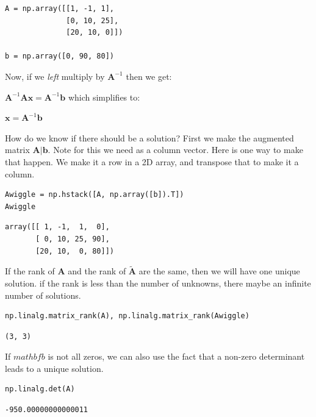 \documentclass[11pt]{article}
\begin{document}
\begin{verbatim}
A = np.array([[1, -1, 1],
              [0, 10, 25],
              [20, 10, 0]])

b = np.array([0, 90, 80])
\end{verbatim}

Now, if we \emph{left} multiply by \(\mathbf{A}^{-1}\) then we get:

\(\mathbf{A}^{-1} \mathbf{A} \mathbf{x} = \mathbf{A}^{-1} \mathbf{b}\) which simplifies to:

\(\mathbf{x} = \mathbf{A}^{-1} \mathbf{b}\)


How do we know if there should be a solution?  First we make the augmented matrix \(\mathbf{A} | \mathbf{b}\). Note for this we need  as a column vector. Here is one way to make that happen. We make it a row in a 2D array, and transpose that to make it a column.

\begin{verbatim}
Awiggle = np.hstack([A, np.array([b]).T])
Awiggle
\end{verbatim}

\begin{verbatim}
array([[ 1, -1,  1,  0],
       [ 0, 10, 25, 90],
       [20, 10,  0, 80]])
\end{verbatim}

If the rank of \(\mathbf{A}\) and the rank of \(\mathbf{\tilde{A}}\) are the same, then we will have one unique solution. if the rank is less than the number of unknowns, there maybe an infinite number of solutions.

\begin{verbatim}
np.linalg.matrix_rank(A), np.linalg.matrix_rank(Awiggle)
\end{verbatim}

\begin{verbatim}
(3, 3)
\end{verbatim}

If \(mathbf{b}\) is not all zeros, we can also use the fact that a non-zero determinant leads to a unique solution.

\begin{verbatim}
np.linalg.det(A)
\end{verbatim}

\begin{verbatim}
-950.00000000000011
\end{verbatim}
\end{document}
